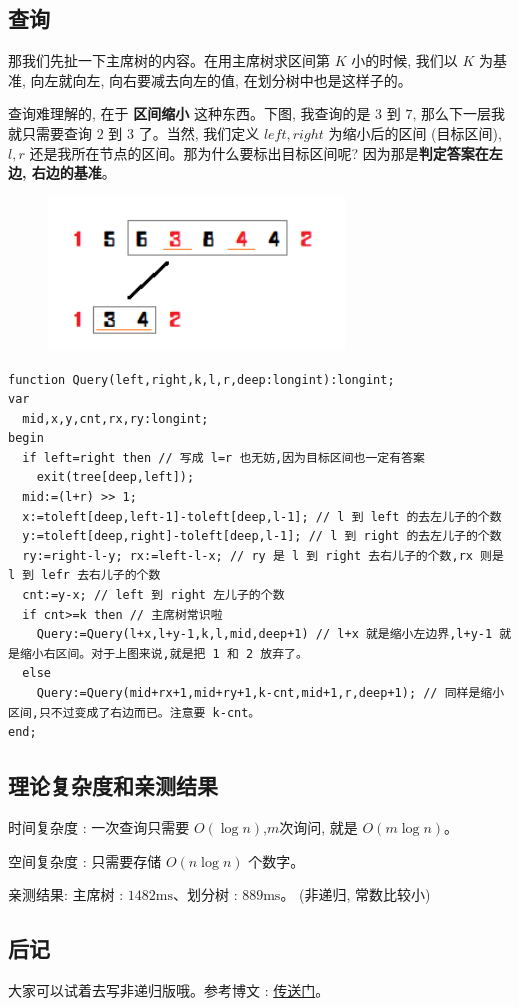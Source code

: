 \subsection{查询}

那我们先扯一下主席树的内容。在用主席树求区间第 $K$ 小的时候, 我们以 $K$ 为基准, 向左就向左, 向右要减去向左的值, 在划分树中也是这样子的。

查询难理解的, 在于 \textbf{区间缩小} 这种东西。下图, 我查询的是 $3$ 到 $7$, 那么下一层我就只需要查询 $2$ 到 $3$ 了。当然, 我们定义 $left,right$ 为缩小后的区间 (目标区间), $l,r$ 还是我所在节点的区间。那为什么要标出目标区间呢? 因为那是\textbf{判定答案在左边, 右边的基准}。

 \begin{figure}[htbp]
\centering
\includegraphics[width=0.7\textwidth]{docs/ds/images/dividing2.png} 

\end{figure}

\begin{verbatim}
function Query(left,right,k,l,r,deep:longint):longint;
var
  mid,x,y,cnt,rx,ry:longint;
begin
  if left=right then // 写成 l=r 也无妨,因为目标区间也一定有答案
    exit(tree[deep,left]);
  mid:=(l+r) >> 1;
  x:=toleft[deep,left-1]-toleft[deep,l-1]; // l 到 left 的去左儿子的个数
  y:=toleft[deep,right]-toleft[deep,l-1]; // l 到 right 的去左儿子的个数
  ry:=right-l-y; rx:=left-l-x; // ry 是 l 到 right 去右儿子的个数,rx 则是 l 到 lefr 去右儿子的个数
  cnt:=y-x; // left 到 right 左儿子的个数
  if cnt>=k then // 主席树常识啦
    Query:=Query(l+x,l+y-1,k,l,mid,deep+1) // l+x 就是缩小左边界,l+y-1 就是缩小右区间。对于上图来说,就是把 1 和 2 放弃了。
  else
    Query:=Query(mid+rx+1,mid+ry+1,k-cnt,mid+1,r,deep+1); // 同样是缩小区间,只不过变成了右边而已。注意要 k-cnt。
end;
\end{verbatim}

\subsection{理论复杂度和亲测结果}

时间复杂度 : 一次查询只需要 $O(\log n)$,$m$次询问, 就是 $O(m\log n)$。

空间复杂度 : 只需要存储 $O(n\log n)$ 个数字。

亲测结果:  主席树 : $1482 \text{ms}$、划分树 : $889 \text{ms}$。 (非递归, 常数比较小)

\subsection{后记}

大家可以试着去写非递归版哦。参考博文 : \href{https://blog.csdn.net/littlewhite520/article/details/70250722}{传送门}。
